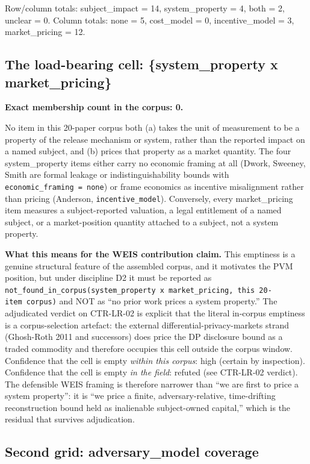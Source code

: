 \documentclass[
  11pt,
]{article}
\newcounter{none} %
\begin{document}
Row/column totals: subject\_impact = 14, system\_property = 4, both = 2,
unclear = 0. Column totals: none = 5, cost\_model = 0, incentive\_model
= 3, market\_pricing = 12.

\subsection{The load-bearing cell: \{system\_property x
market\_pricing\}}\label{the-load-bearing-cell-system_property-x-market_pricing}

\textbf{Exact membership count in the corpus: 0.}

No item in this 20-paper corpus both (a) takes the unit of measurement
to be a property of the release mechanism or system, rather than the
reported impact on a named subject, and (b) prices that property as a
market quantity. The four system\_property items either carry no
economic framing at all (Dwork, Sweeney, Smith are formal leakage or
indistinguishability bounds with \texttt{economic\_framing\ =\ none}) or
frame economics as incentive misalignment rather than pricing (Anderson,
\texttt{incentive\_model}). Conversely, every market\_pricing item
measures a subject-reported valuation, a legal entitlement of a named
subject, or a market-position quantity attached to a subject, not a
system property.

\textbf{What this means for the WEIS contribution claim.} This emptiness
is a genuine structural feature of the assembled corpus, and it
motivates the PVM position, but under discipline D2 it must be reported
as
\texttt{not\_found\_in\_corpus(system\_property\ x\ market\_pricing,\ this\ 20-item\ corpus)}
and NOT as ``no prior work prices a system property.'' The adjudicated
verdict on CTR-LR-02 is explicit that the literal in-corpus emptiness is
a corpus-selection artefact: the external differential-privacy-markets
strand (Ghosh-Roth 2011 and successors) does price the DP disclosure
bound as a traded commodity and therefore occupies this cell outside the
corpus window. Confidence that the cell is empty \emph{within this
corpus}: high (certain by inspection). Confidence that the cell is empty
\emph{in the field}: refuted (see CTR-LR-02 verdict). The defensible
WEIS framing is therefore narrower than ``we are first to price a system
property'': it is ``we price a finite, adversary-relative, time-drifting
reconstruction bound held as inalienable subject-owned capital,'' which
is the residual that survives adjudication.

\subsection{Second grid: adversary\_model
coverage}\label{second-grid-adversary_model-coverage}
\end{document}

